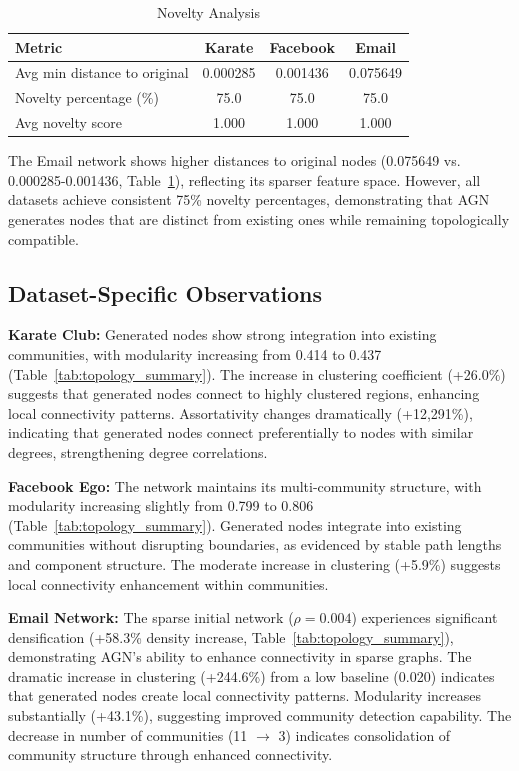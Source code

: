\documentclass[12pt]{article}
\begin{document}
\begin{table}[h]
\centering
\caption{Novelty Analysis}
\label{tab:novelty}
\begin{tabular}{lccc}
\toprule
Metric & Karate & Facebook & Email \\
\midrule
Avg min distance to original & 0.000285 & 0.001436 & 0.075649 \\
Novelty percentage (\%) & 75.0 & 75.0 & 75.0 \\
Avg novelty score & 1.000 & 1.000 & 1.000 \\
\bottomrule
\end{tabular}
\end{table}

The Email network shows higher distances to original nodes (0.075649 vs. 0.000285-0.001436, Table~\ref{tab:novelty}), reflecting its sparser feature space. However, all datasets achieve consistent 75\% novelty percentages, demonstrating that AGN generates nodes that are distinct from existing ones while remaining topologically compatible.

\subsection{Dataset-Specific Observations}

\textbf{Karate Club:} Generated nodes show strong integration into existing communities, with modularity increasing from 0.414 to 0.437 (Table~\ref{tab:topology_summary}). The increase in clustering coefficient (+26.0\%) suggests that generated nodes connect to highly clustered regions, enhancing local connectivity patterns. Assortativity changes dramatically (+12,291\%), indicating that generated nodes connect preferentially to nodes with similar degrees, strengthening degree correlations.

\textbf{Facebook Ego:} The network maintains its multi-community structure, with modularity increasing slightly from 0.799 to 0.806 (Table~\ref{tab:topology_summary}). Generated nodes integrate into existing communities without disrupting boundaries, as evidenced by stable path lengths and component structure. The moderate increase in clustering (+5.9\%) suggests local connectivity enhancement within communities.

\textbf{Email Network:} The sparse initial network ($\rho = 0.004$) experiences significant densification (+58.3\% density increase, Table~\ref{tab:topology_summary}), demonstrating AGN's ability to enhance connectivity in sparse graphs. The dramatic increase in clustering (+244.6\%) from a low baseline (0.020) indicates that generated nodes create local connectivity patterns. Modularity increases substantially (+43.1\%), suggesting improved community detection capability. The decrease in number of communities (11 $\rightarrow$ 3) indicates consolidation of community structure through enhanced connectivity.
\end{document}
